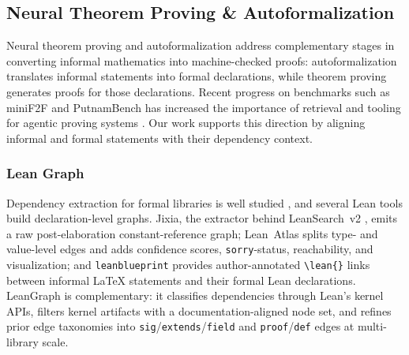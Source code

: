 \subsection{Neural Theorem Proving \& Autoformalization}
\label{sec:ntp-autoform}
Neural theorem proving and autoformalization address complementary stages in converting informal mathematics into machine-checked proofs: autoformalization translates informal statements into formal declarations, while theorem proving generates proofs for those declarations. Recent progress on benchmarks such as miniF2F and PutnamBench has increased the importance of retrieval and tooling for agentic proving systems \cite{minif2f-v1, minif2f-v2, tsoukalas2024putnambenchevaluatingneuraltheoremprovers, requena2026minimalagentautomatedtheorem, liu2026numinaleanagentopengeneralagentic}. Our work supports this direction by aligning informal and formal statements with their dependency context.


\subsubsection{Lean Graph}
\label{sec:leangraph}
Dependency extraction for formal libraries is well studied \cite{alama-formal-deps}, and several Lean tools build declaration-level graphs. Jixia, the extractor behind LeanSearch~v2 \cite{jixia}, emits a raw post-elaboration constant-reference graph; Lean~Atlas \cite{yanahama2026leanatlas} splits type- and value-level edges and adds confidence scores, \texttt{sorry}-status, reachability, and visualization; and \texttt{leanblueprint} \cite{massot2020leanblueprint} provides author-annotated \texttt{\textbackslash lean\{\}} links between informal LaTeX statements and their formal Lean declarations. LeanGraph is complementary: it classifies dependencies through Lean's kernel APIs, filters kernel artifacts with a documentation-aligned node set, and refines prior edge taxonomies into \texttt{sig}/\texttt{extends}/\texttt{field} and \texttt{proof}/\texttt{def} edges at multi-library scale.